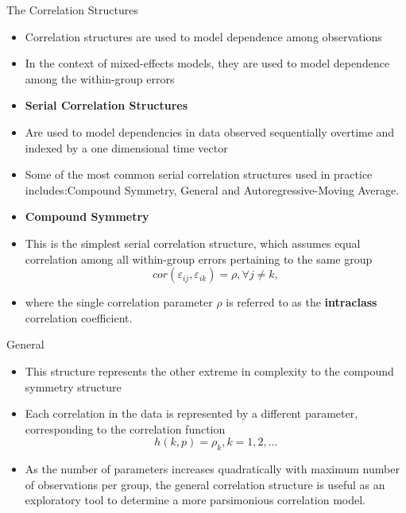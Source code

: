 \documentclass{beamer}
\begin{document}
\begin{frame}{The Correlation Structures}
\begin{itemize}
\item Correlation structures are used to model dependence among observations
\item In the context of mixed-effects models, they are used to model dependence among the within-group errors
\item \textbf{Serial Correlation Structures}\\
\item Are used to model dependencies in data observed sequentially overtime and indexed by a one dimensional time vector
\item Some of the most common serial correlation structures used in practice includes:Compound Symmetry, General and Autoregressive-Moving Average.
\item \textbf{Compound Symmetry} 
\item This is the simplest serial correlation structure, which assumes equal correlation among all within-group errors pertaining to the same group
\begin{equation}
cor(\varepsilon_{ij},\varepsilon_{ik})=\rho,\forall j\neq k,	
\end{equation}
\item where the single correlation parameter $\rho$ is referred to as the \textbf{intraclass} correlation coefficient.
\end{itemize}
\end{frame}

\begin{frame}{General}
\begin{itemize}
\item This structure represents the other extreme in complexity to the compound symmetry structure
\item Each correlation in the data is represented by a different parameter, corresponding to the correlation function
\begin{equation}
h(k,p)=\rho_k, k=1,2,\ldots	
\end{equation}
\item As the number of parameters increases quadratically with maximum number of observations per group, the general correlation structure is useful as an exploratory tool to determine a more parsimonious correlation model.
\end{itemize}
\end{frame}
\end{document}
